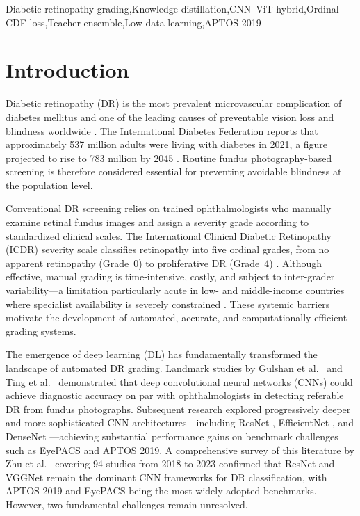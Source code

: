 \documentclass[a4paper,fleqn]{cas-dc}
\begin{document}
\begin{keywords}
Diabetic retinopathy grading\sep Knowledge distillation\sep CNN--ViT hybrid\sep Ordinal CDF loss\sep Teacher ensemble\sep Low-data learning\sep APTOS 2019
\end{keywords}

\maketitle

\section{Introduction}
\label{sec:intro}

Diabetic retinopathy (DR) is the most prevalent microvascular complication of diabetes mellitus and one of the leading causes of preventable vision loss and blindness worldwide \cite{yau2012}. The International Diabetes Federation reports that approximately 537 million adults were living with diabetes in 2021, a figure projected to rise to 783 million by 2045 \cite{idf2021}. Routine fundus photography-based screening is therefore considered essential for preventing avoidable blindness at the population level.

Conventional DR screening relies on trained ophthalmologists who manually examine retinal fundus images and assign a severity grade according to standardized clinical scales. The International Clinical Diabetic Retinopathy (ICDR) severity scale classifies retinopathy into five ordinal grades, from no apparent retinopathy (Grade~0) to proliferative DR (Grade~4) \cite{wilkinson2003}. Although effective, manual grading is time-intensive, costly, and subject to inter-grader variability---a limitation particularly acute in low- and middle-income countries where specialist availability is severely constrained \cite{krause2018}. These systemic barriers motivate the development of automated, accurate, and computationally efficient grading systems.

The emergence of deep learning (DL) has fundamentally transformed the landscape of automated DR grading. Landmark studies by Gulshan et al.\ \cite{gulshan2016} and Ting et al.\ \cite{ting2017} demonstrated that deep convolutional neural networks (CNNs) could achieve diagnostic accuracy on par with ophthalmologists in detecting referable DR from fundus photographs. Subsequent research explored progressively deeper and more sophisticated CNN architectures---including ResNet \cite{he2016}, EfficientNet \cite{tan2019}, and DenseNet \cite{huang2017}---achieving substantial performance gains on benchmark challenges such as EyePACS and APTOS 2019. A comprehensive survey of this literature by Zhu et al.\ \cite{zhu2024} covering 94 studies from 2018 to 2023 confirmed that ResNet and VGGNet remain the dominant CNN frameworks for DR classification, with APTOS 2019 and EyePACS being the most widely adopted benchmarks. However, two fundamental challenges remain unresolved.
\end{document}
